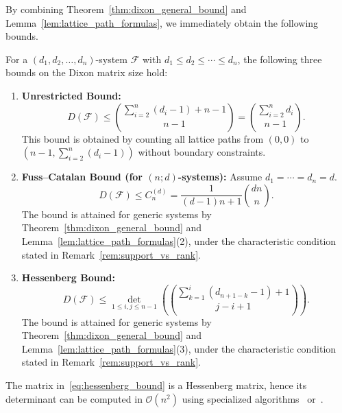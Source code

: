 By combining Theorem~\ref{thm:dixon_general_bound} and Lemma~\ref{lem:lattice_path_formulas}, we immediately obtain the following bounds.

\begin{corollary}\label{cor:three_bounds}
	For a $(d_1, d_2, \ldots, d_n)$-system $\mathcal{F}$ with $d_1 \leq d_2 \leq \cdots \leq d_n$, the following three bounds on the Dixon matrix size hold:
	\begin{enumerate}
		
		\item[(1)] \textbf{Unrestricted Bound:} 
		\begin{equation}\label{eq:unrestricted_bound}
			D(\mathcal{F}) \leq \binom{\sum_{i=2}^{n} (d_i - 1) + n - 1}{n - 1} = \binom{\sum_{i=2}^{n} d_i}{n - 1}.
		\end{equation}
		This bound is obtained by counting all lattice paths from $(0,0)$ to $(n-1, \sum_{i=2}^{n} (d_i - 1))$ without boundary constraints.
		
		\item[(2)] \textbf{Fuss--Catalan Bound (for $(n;d)$-systems):}
		Assume $d_1 = \cdots = d_n = d$.
		\begin{equation}\label{eq:fuss_catalan_bound}
			D(\mathcal{F}) \leq C_n^{(d)} = \frac{1}{(d-1)n+1}\binom{dn}{n}.
		\end{equation}
		The bound is attained for generic systems by Theorem~\ref{thm:dixon_general_bound} and Lemma~\ref{lem:lattice_path_formulas}(2), under the characteristic condition stated in Remark~\ref{rem:support_vs_rank}.
		
		\item[(3)] \textbf{Hessenberg Bound:} 
		\begin{equation}\label{eq:hessenberg_bound}
			D(\mathcal{F}) \leq \det_{1\leq i,j\leq n-1} \left( \binom{\sum_{k=1}^{i} (d_{n+1-k} - 1) + 1}{j - i + 1} \right).
		\end{equation}
		The bound is attained for generic systems by Theorem~\ref{thm:dixon_general_bound} and Lemma~\ref{lem:lattice_path_formulas}(3), under the characteristic condition stated in Remark~\ref{rem:support_vs_rank}.
		
		
	\end{enumerate}
\end{corollary}

\begin{remark}
	The matrix in~\eqref{eq:hessenberg_bound} is a Hessenberg matrix, hence its determinant can be computed in $\mathcal{O}(n^2)$ using specialized algorithms~\cite{cahill2002fibonacci} or~\cite[Theorem 1.9]{meurant2025hessenberg}.
\end{remark}

